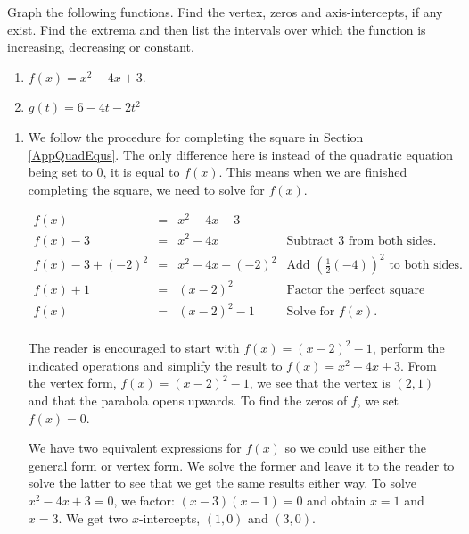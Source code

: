 \documentclass{ximera}
\begin{document}
\begin{example}  \label{parabolaex2} Graph the following functions.  Find the vertex, zeros and axis-intercepts, if any exist. Find the extrema and then list the intervals over which the function is increasing, decreasing or constant.


\begin{enumerate}

\item  $f(x) = x^2-4x+3$.
\item  $g(t) = 6 - 4t -2t^2$

\end{enumerate}



\begin{explanation}
    


\begin{enumerate}

\item   We follow the procedure for completing the square in Section \ref{AppQuadEqus}.  The only difference here is instead of the quadratic equation being set to $0$, it is equal to $f(x)$.  This means when we are finished completing the square, we need to solve for $f(x)$.

\[ \begin{array}{rclr}

f(x) & = & x^2 - 4x+3 & \\  
f(x) - 3 & = & x^2-4x & \text{Subtract $3$ from both sides.} \\  
f(x) - 3 + (-2)^2 & = & x^2-4x+(-2)^2 & \text{Add $\left(\frac{1}{2}(-4)\right)^2$ to both sides.} \\  

f(x) + 1 & = &  (x-2)^2 & \text{Factor the perfect square trinomial.} \\  

f(x) & = & (x-2)^2 - 1 & \text{Solve for $f(x)$.} \\ \end{array}\]

The reader is encouraged to start with $f(x) = (x-2)^2-1$, perform the indicated operations and simplify the result to $f(x) = x^2-4x+3$.  From the vertex form, $f(x) = (x-2)^2-1$, we see that the vertex is $(2,1)$ and that the parabola opens upwards.  To find the zeros of $f$, we set $f(x) = 0$.

\medskip

We have two equivalent expressions for $f(x)$ so we could use either the general form or vertex form.  We solve the former and leave it to the reader to solve the latter to see that we get the same results either way.  To solve $x^2 - 4x + 3 = 0$, we factor: $(x-3)(x-1) = 0$ and obtain $x = 1$ and $x =3$.  We get two $x$-intercepts, $(1,0)$ and $(3,0)$. 


\end{enumerate}
\end{explanation}
\end{example}
\end{document}
